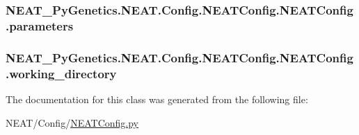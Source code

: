 \subsubsection[{\texorpdfstring{parameters}{parameters}}]{\setlength{\rightskip}{0pt plus 5cm}N\+E\+A\+T\+\_\+\+Py\+Genetics.\+N\+E\+A\+T.\+Config.\+N\+E\+A\+T\+Config.\+N\+E\+A\+T\+Config.\+parameters}\hypertarget{classNEAT__PyGenetics_1_1NEAT_1_1Config_1_1NEATConfig_1_1NEATConfig_a04ae4f640ee3d8a9dadbbe0a293bb3d6}{}\label{classNEAT__PyGenetics_1_1NEAT_1_1Config_1_1NEATConfig_1_1NEATConfig_a04ae4f640ee3d8a9dadbbe0a293bb3d6}
\subsubsection[{\texorpdfstring{working\+\_\+directory}{working_directory}}]{\setlength{\rightskip}{0pt plus 5cm}N\+E\+A\+T\+\_\+\+Py\+Genetics.\+N\+E\+A\+T.\+Config.\+N\+E\+A\+T\+Config.\+N\+E\+A\+T\+Config.\+working\+\_\+directory}\hypertarget{classNEAT__PyGenetics_1_1NEAT_1_1Config_1_1NEATConfig_1_1NEATConfig_ac88a0f28d412192f52a5cb55935beaa4}{}\label{classNEAT__PyGenetics_1_1NEAT_1_1Config_1_1NEATConfig_1_1NEATConfig_ac88a0f28d412192f52a5cb55935beaa4}


The documentation for this class was generated from the following file\+:\begin{DoxyCompactItemize}
\item 
N\+E\+A\+T/\+Config/\hyperlink{NEATConfig_8py}{N\+E\+A\+T\+Config.\+py}\end{DoxyCompactItemize}
